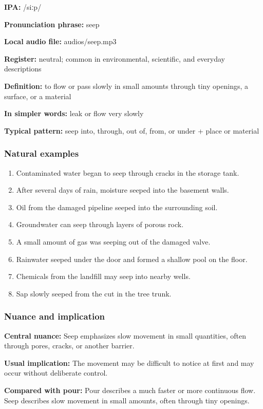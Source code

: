 \documentclass[11pt]{article}
\begin{document}
\textbf{IPA:} /siːp/

\textbf{Pronunciation phrase:} seep

\textbf{Local audio file:} audios/seep.mp3

\textbf{Register:} neutral; common in environmental, scientific, and everyday descriptions

\textbf{Definition:} to flow or pass slowly in small amounts through tiny openings, a surface, or a material

\textbf{In simpler words:} leak or flow very slowly

\textbf{Typical pattern:} seep into, through, out of, from, or under + place or material

\subsubsection{Natural examples}
\begin{enumerate}
  \item Contaminated water began to seep through cracks in the storage tank.
  \item After several days of rain, moisture seeped into the basement walls.
  \item Oil from the damaged pipeline seeped into the surrounding soil.
  \item Groundwater can seep through layers of porous rock.
  \item A small amount of gas was seeping out of the damaged valve.
  \item Rainwater seeped under the door and formed a shallow pool on the floor.
  \item Chemicals from the landfill may seep into nearby wells.
  \item Sap slowly seeped from the cut in the tree trunk.
\end{enumerate}

\subsubsection{Nuance and implication}
\textbf{Central nuance:} Seep emphasizes slow movement in small quantities, often through pores, cracks, or another barrier.

\textbf{Usual implication:} The movement may be difficult to notice at first and may occur without deliberate control.

\textbf{Compared with pour:} Pour describes a much faster or more continuous flow. Seep describes slow movement in small amounts, often through tiny openings.
\end{document}
